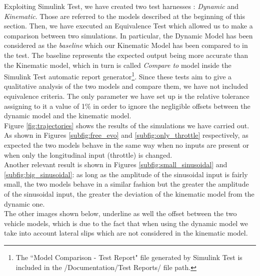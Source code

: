 Exploiting Simulink Test, we have created two test harnesses : \textit{Dynamic} and \textit{Kinematic}. Those are referred to the models described at the beginning of this section. Then, we have executed an Equivalence Test which allowed us to make a comparison between two simulations. In particular, the Dynamic Model has been considered as the \textit{baseline} which our Kinematic Model has been compared to in the test. The baseline represents the expected output being more accurate than the Kinematic model, which in turn is called \textit{Compare to} model inside the Simulink Test automatic report generator\footnote{The ``Model Comparison - Test Report" file generated by Simulink Test is included in the /Documentation/Test Reports/ file path.}. 
Since these tests aim to give a qualitative analysis of the two models and compare them, we have not included equivalence criteria.
The only parameter we have set up is the relative tolerance assigning to it a value of 1\% in order to ignore the negligible offsets between the dynamic model and the kinematic model.\\
Figure \ref{fig:trajectories} shows the results of the simulations we have carried out. 
As shown in Figures \ref{subfig:free_evo} and \ref{subfig:only_throttle} respectively, as expected the two models behave in the same way when no inputs are present or when only the longitudinal input (throttle) is changed. \\ Another relevant result is shown in Figures \ref{subfig:small_sinusoidal} and \ref{subfig:big_sinusoidal}: as long as the amplitude of the sinusoidal input is fairly small, the two models behave in a similar fashion but the greater the amplitude of the sinusoidal input, the greater the deviation of the kinematic model from the dynamic one.\\
The other images shown below, underline as well the offset between the two vehicle models, which is due to the fact that when using the dynamic model we take into account lateral slips which are not considered in the kinematic model.


